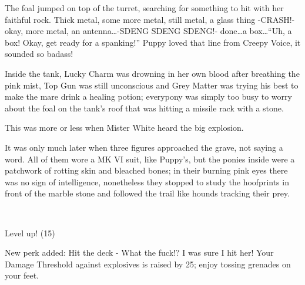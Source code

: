 The foal jumped on top of the turret, searching for something to hit with her faithful rock. Thick metal, some more metal, still metal, a glass thing -CRASH!- okay, more metal, an antenna\dots -SDENG SDENG SDENG!- done\dots a box\dots ``Uh, a box! Okay, get ready for a spanking!'' Puppy loved that line from Creepy Voice, it sounded so badass!

Inside the tank, Lucky Charm was drowning in her own blood after breathing the pink mist, Top Gun was still unconscious and Grey Matter was trying his best to make the mare drink a healing potion; everypony was simply too busy to worry about the foal on the tank's roof that was hitting a missile rack with a stone.

This was more or less when Mister White heard the big explosion.

\horizonline


It was only much later when three figures approached the grave, not saying a word. All of them wore a MK VI suit, like Puppy's, but the ponies inside were a patchwork of rotting skin and bleached bones; in their burning pink eyes there was no sign of intelligence, nonetheless they stopped to study the hoofprints in front of the marble stone and followed the trail like hounds tracking their prey.

~\vfill

\begin{engnote}
    Level up! (15)
    
    New perk added: Hit the deck - What the fuck!? I was sure I hit her! Your Damage Threshold against explosives is raised by 25; enjoy tossing grenades on your feet.
\end{engnote}

